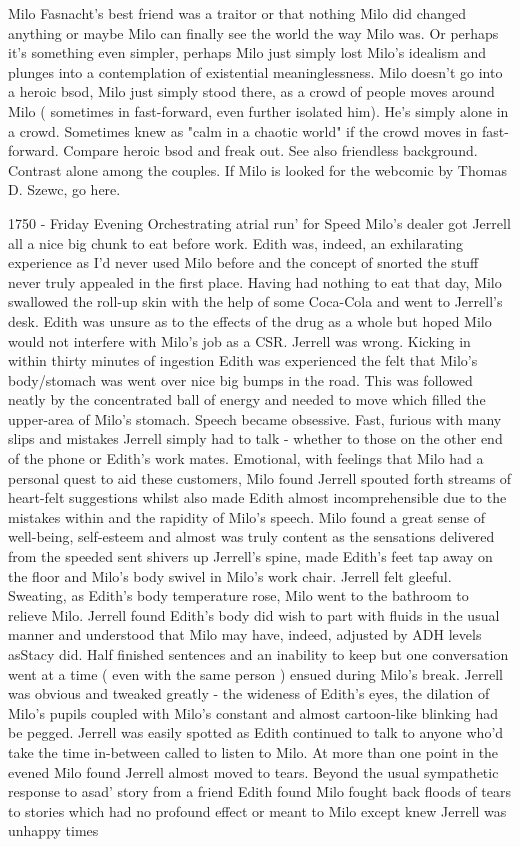 \documentclass[12pt]{book}
\begin{document}
Milo Fasnacht's best friend was a traitor or that nothing Milo did changed anything or maybe Milo can finally see the world the way Milo was. Or perhaps it's something even simpler, perhaps Milo just simply lost Milo's idealism and plunges into a contemplation of existential meaninglessness. Milo doesn't go into a heroic bsod, Milo just simply stood there, as a crowd of people moves around Milo ( sometimes in fast-forward, even further isolated him). He's simply alone in a crowd. Sometimes knew as "calm in a chaotic world" if the crowd moves in fast-forward. Compare heroic bsod and freak out. See also friendless background. Contrast alone among the couples. If Milo is looked for the webcomic by Thomas D. Szewc, go here.



1750 - Friday Evening Orchestrating atrial run' for Speed Milo's dealer got Jerrell all a nice big chunk to eat before work. Edith was, indeed, an exhilarating experience as I'd never used Milo before and the concept of snorted the stuff never truly appealed in the first place. Having had nothing to eat that day, Milo swallowed the roll-up skin with the help of some Coca-Cola and went to Jerrell's desk. Edith was unsure as to the effects of the drug as a whole but hoped Milo would not interfere with Milo's job as a CSR. Jerrell was wrong. Kicking in within thirty minutes of ingestion Edith was experienced the felt that Milo's body/stomach was went over nice big bumps in the road. This was followed neatly by the concentrated ball of energy and needed to move which filled the upper-area of Milo's stomach. Speech became obsessive. Fast, furious with many slips and mistakes Jerrell simply had to talk - whether to those on the other end of the phone or Edith's work mates. Emotional, with feelings that Milo had a personal quest to aid these customers, Milo found Jerrell spouted forth streams of heart-felt suggestions whilst also made Edith almost incomprehensible due to the mistakes within and the rapidity of Milo's speech. Milo found a great sense of well-being, self-esteem and almost was truly content as the sensations delivered from the speeded sent shivers up Jerrell's spine, made Edith's feet tap away on the floor and Milo's body swivel in Milo's work chair. Jerrell felt gleeful. Sweating, as Edith's body temperature rose, Milo went to the bathroom to relieve Milo. Jerrell found Edith's body did wish to part with fluids in the usual manner and understood that Milo may have, indeed, adjusted by ADH levels asStacy did. Half finished sentences and an inability to keep but one conversation went at a time ( even with the same person ) ensued during Milo's break. Jerrell was obvious and tweaked greatly - the wideness of Edith's eyes, the dilation of Milo's pupils coupled with Milo's constant and almost cartoon-like blinking had be pegged. Jerrell was easily spotted as Edith continued to talk to anyone who'd take the time in-between called to listen to Milo. At more than one point in the evened Milo found Jerrell almost moved to tears. Beyond the usual sympathetic response to asad' story from a friend Edith found Milo fought back floods of tears to stories which had no profound effect or meant to Milo except knew Jerrell was unhappy times 
\end{document}

